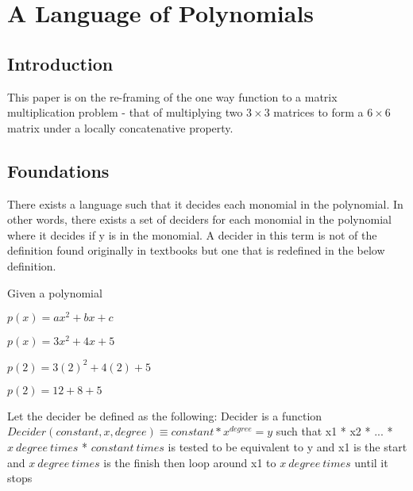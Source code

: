 
\chapter{A Language of Polynomials} %

\label{Chapter1} %


\newcommand{\keyword}[1]{\textbf{#1}}
\newcommand{\tabhead}[1]{\textbf{#1}}
\newcommand{\code}[1]{\texttt{#1}}
\newcommand{\file}[1]{\texttt{\bfseries#1}}
\newcommand{\option}[1]{\texttt{\itshape#1}}


\section{Introduction}
This paper is on the re-framing of the one way function to a matrix multiplication problem - that of multiplying two $3 \times 3$ matrices to form a $6 \times 6$ matrix under a locally concatenative property.


\section{Foundations}

There exists a language such that it decides each monomial in the polynomial. In other words, there exists a set of deciders for each monomial in the polynomial where it decides if y is in the monomial. A decider in this term is not of the definition found originally in textbooks but one that is redefined in the below definition.

Given a polynomial

$p(x) = ax^2 + bx + c$

$p(x) = 3x^2 + 4x + 5$

$p(2) = 3(2)^2 + 4(2) + 5$

$p(2) = 12 + 8 + 5$

Let the decider be defined as the following:
Decider is a function $Decider(constant, x, degree) \equiv constant*x^{degree} = y$
such that
x1 * x2 * ... * $x\ degree\ times$ * $constant\ times$ is tested to be equivalent to y
and x1 is the start
and $x\ degree\ times$ is the finish
then loop around x1 to $x\ degree\ times$ until it stops

